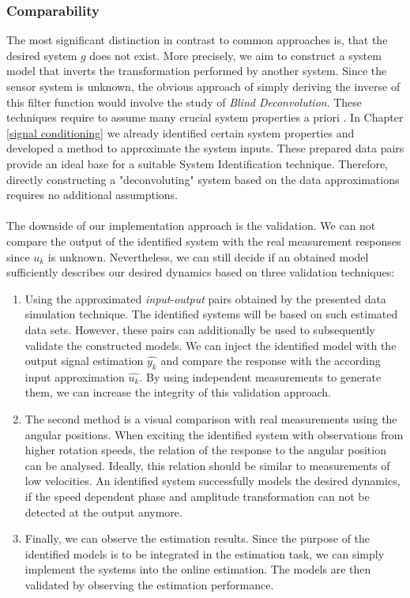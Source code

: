 \documentclass[english]{isasthesis}
\begin{document}
    	\subsubsection{Comparability}
    	The most significant distinction in contrast to common approaches is, that the desired system $g$ does not exist. More precisely, we aim to construct a system model that inverts the transformation performed by another system. Since the sensor system is unknown, the obvious approach of simply deriving the inverse of this filter function would involve the study of \textit{Blind Deconvolution}. These techniques require to assume many crucial system properties a priori \cite{489268}. In Chapter \ref{signal conditioning} we already identified certain system properties and developed a method to approximate the system inputs. These prepared data pairs provide an ideal base for a suitable System Identification technique. Therefore, directly constructing a "deconvoluting" system  based on the data approximations requires no additional assumptions. \\\\
    	The downside of our implementation approach is the validation. We can not compare the output of the identified system with the real measurement responses since $u_k$ is unknown. Nevertheless, we can still decide if an obtained model sufficiently describes our desired dynamics based on three validation techniques:
    	\begin{enumerate}
    		\item Using the approximated \textit{input}-\textit{output} pairs obtained by the presented data simulation technique. The identified systems will be based on such estimated data sets. However, these pairs can additionally be used to subsequently validate the constructed models. We can inject the identified model with the output signal estimation $\hat{y_k}$ and compare the response with the according input approximation $\hat{u_k}$. By using independent measurements to generate them, we can increase the integrity of this validation approach. 
    		\item The second method is a visual comparison with real measurements using the angular positions. When exciting the identified system with observations from higher rotation speeds, the relation of the response to the angular position can be analysed. Ideally, this relation should be similar to measurements of low velocities. An identified system successfully models the desired dynamics, if the speed dependent phase and amplitude transformation can not be detected at the output anymore. 
    		\item Finally, we can observe the estimation results. Since the purpose of the identified models is to be integrated in the estimation task, we can simply implement the systems into the online estimation. The models are then validated by observing the estimation performance.
    	\end{enumerate}
    	
\end{document}
